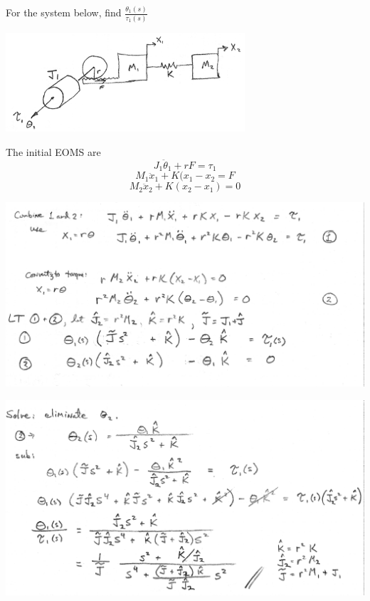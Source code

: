 \begin{Example}
For the system below, find  $\frac{\theta_1(s)}{\tau_1(s)}$

\includegraphics[width=3.5in]{figs03/00754a.png}

The initial EOMS are
\[
J_1\ddot{\theta}_1 + rF = \tau_1
\]
\[
M_1\ddot{x}_1 + K(x_1-x_2 = F
\]
\[
M_2\ddot{x}_2+K(x_2-x_1)  = 0
\]

\includegraphics[width=6.0in]{figs03/00756aa.png}

\end{Example}

\begin{ExampleCont}

\includegraphics[width=6.0in]{figs03/00756ba.png}

\end{ExampleCont}

